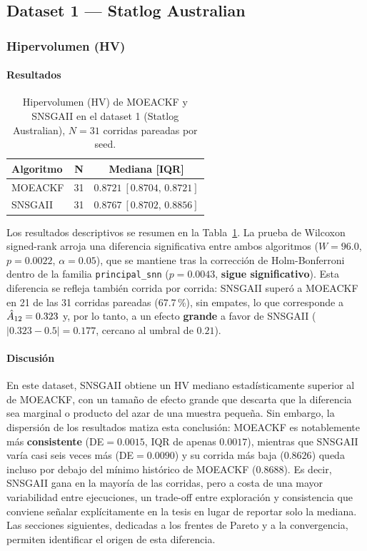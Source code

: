 \subsection{Dataset 1 --- Statlog Australian}
\label{sec:ds1}

\subsubsection{Hipervolumen (HV)}
\label{sec:ds1-hv}

\paragraph{Resultados}

\begin{table}[htbp]
\centering
\small
\caption{Hipervolumen (HV) de MOEACKF y SNSGAII en el dataset 1 (Statlog Australian), $N=31$
corridas pareadas por seed.}
\label{tab:hv-ds1}
\begin{tabular}{@{}lcc@{}}
\toprule
\textbf{Algoritmo} & \textbf{N} & \textbf{Mediana [IQR]} \\
\midrule
MOEACKF & 31 & $0.8721\ [0.8704,\,0.8721]$ \\
SNSGAII & 31 & $0.8767\ [0.8702,\,0.8856]$ \\
\bottomrule
\end{tabular}
\end{table}

Los resultados descriptivos se resumen en la Tabla~\ref{tab:hv-ds1}. La prueba de Wilcoxon
signed-rank arroja una diferencia significativa entre ambos algoritmos ($W=96.0$, $p=0.0022$,
$\alpha=0.05$), que se mantiene tras la corrección de Holm-Bonferroni dentro de la familia
\texttt{principal\_snn} ($p=0.0043$, \textbf{sigue significativo}). Esta diferencia se refleja
también corrida por corrida: SNSGAII superó a MOEACKF en 21 de las 31 corridas pareadas
(67.7\,\%), sin empates, lo que corresponde a $\hat{A}_{12}=0.323$ y, por lo tanto, a un efecto
\textbf{grande} a favor de SNSGAII ($|0.323-0.5|=0.177$, cercano al umbral de $0.21$).

\paragraph{Discusión}

En este dataset, SNSGAII obtiene un HV mediano estadísticamente superior al de MOEACKF, con un
tamaño de efecto grande que descarta que la diferencia sea marginal o producto del azar de una
muestra pequeña. Sin embargo, la dispersión de los resultados matiza esta conclusión: MOEACKF es
notablemente más \textbf{consistente} (DE$=0.0015$, IQR de apenas $0.0017$), mientras que
SNSGAII varía casi seis veces más (DE$=0.0090$) y su corrida más baja ($0.8626$) queda incluso
por debajo del mínimo histórico de MOEACKF ($0.8688$). Es decir, SNSGAII gana en la mayoría de
las corridas, pero a costa de una mayor variabilidad entre ejecuciones, un trade-off entre
exploración y consistencia que conviene señalar explícitamente en la tesis en lugar de reportar
solo la mediana. Las secciones siguientes, dedicadas a los frentes de Pareto y a la convergencia,
permiten identificar el origen de esta diferencia.

